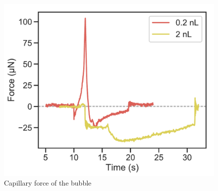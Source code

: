 \documentclass[english]{achemso}
\begin{document}
\begin{figure}[H]
\begin{centering}
\includegraphics{FigureS4-Expt_bubble_force}\caption{Capillary force of the bubble}
\par\end{centering}
\end{figure}


\end{document}
